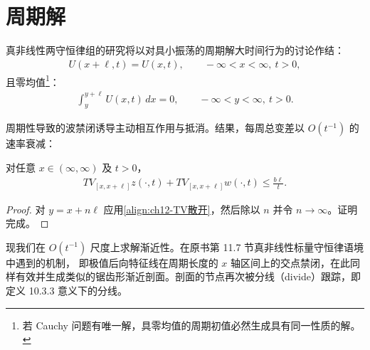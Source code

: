 \documentclass[../../main.tex]{subfiles}
\begin{document}
\section{周期解}\label{section:ch12-周期解}

真非线性两守恒律组的研究将以对具小振荡的周期解大时间行为的讨论作结：
\begin{align}
U(x+\ell,t)=U(x,t),\qquad -\infty<x<\infty,\ t>0,
\label{align:ch12-周期}
\end{align}
且零均值\footnote{若 Cauchy 问题有唯一解，具零均值的周期初值必然生成具有同一性质的解。}：
\begin{align}
\int_y^{y+\ell}U(x,t)\,dx=0,\qquad -\infty<y<\infty,\ t>0.
\label{align:ch12-零均值}
\end{align}

周期性导致的波禁闭诱导主动相互作用与抵消。结果，每周总变差以 $O(t^{-1})$ 的速率衰减：

\begin{theorem}\label{theorem:ch12-周期TV}
对任意 $x\in(\infty,\infty)$ 及 $t>0$，
\begin{align}
TV_{[x,x+\ell]}z(\cdot,t)+TV_{[x,x+\ell]}w(\cdot,t)\leqslant\frac{b\ell}{t}.
\label{align:ch12-周期TV}
\end{align}
\end{theorem}

\begin{proof}
对 $y=x+n\ell$ 应用\eqref{align:ch12-TV散开}，然后除以 $n$ 并令 $n\to\infty$。证明完成。
\end{proof}

现我们在 $O(t^{-1})$ 尺度上求解渐近性。在原书第 11.7 节真非线性标量守恒律语境中遇到的机制，
即极值后向特征线在周期长度的 $x$ 轴区间上的交点禁闭，在此同样有效并生成类似的锯齿形渐近剖面。剖面的节点再次被分线（divide）跟踪，即定义 10.3.3 意义下的分线。
\end{document}
